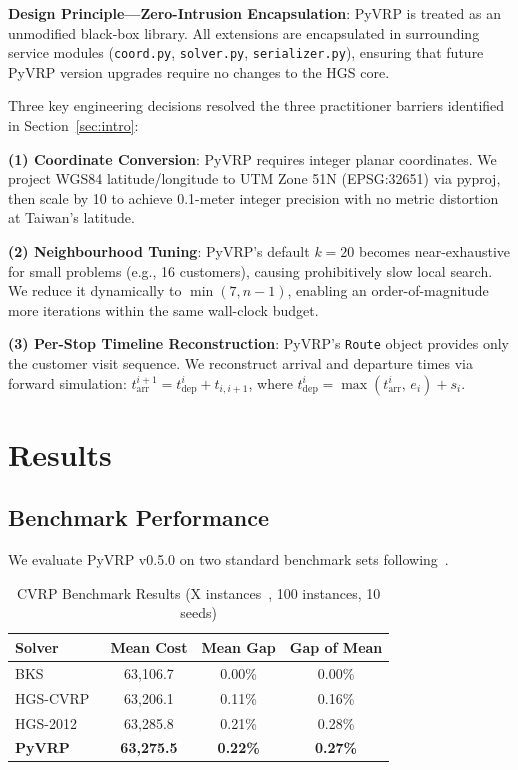 \documentclass[conference]{IEEEtran}
\begin{document}
\textbf{Design Principle---Zero-Intrusion Encapsulation}: PyVRP is treated
as an unmodified black-box library. All extensions are encapsulated in
surrounding service modules (\texttt{coord.py}, \texttt{solver.py},
\texttt{serializer.py}), ensuring that future PyVRP version upgrades require
no changes to the HGS core.

Three key engineering decisions resolved the three practitioner barriers
identified in Section~\ref{sec:intro}:

\textbf{(1) Coordinate Conversion}: PyVRP requires integer planar
coordinates. We project WGS84 latitude/longitude to UTM Zone 51N
(EPSG:32651) via pyproj, then scale by 10 to achieve 0.1-meter integer
precision with no metric distortion at Taiwan's latitude.

\textbf{(2) Neighbourhood Tuning}: PyVRP's default $k=20$ becomes
near-exhaustive for small problems (e.g., 16 customers), causing prohibitively
slow local search. We reduce it dynamically to $\min(7,n{-}1)$, enabling an
order-of-magnitude more iterations within the same wall-clock budget.

\textbf{(3) Per-Stop Timeline Reconstruction}: PyVRP's \texttt{Route}
object provides only the customer visit sequence. We reconstruct arrival and
departure times via forward simulation:
$t_{\text{arr}}^{i+1} = t_{\text{dep}}^i + t_{i,i+1}$, where
$t_{\text{dep}}^i = \max(t_{\text{arr}}^i,\, e_i) + s_i$.

\section{Results}

\subsection{Benchmark Performance}

We evaluate PyVRP v0.5.0 on two standard benchmark sets following~\cite{wouda2024pyvrp}.

\begin{table}[h]
\caption{CVRP Benchmark Results (X instances~\cite{uchoa2017new}, 100 instances, 10 seeds)}
\label{tab:cvrp}
\centering
\begin{tabular}{lccc}
\toprule
\textbf{Solver} & \textbf{Mean Cost} & \textbf{Mean Gap} & \textbf{Gap of Mean} \\
\midrule
BKS             & 63,106.7 & 0.00\% & 0.00\% \\
HGS-CVRP~\cite{vidal2022hybrid} & 63,206.1 & 0.11\% & 0.16\% \\
HGS-2012~\cite{vidal2013hybrid} & 63,285.8 & 0.21\% & 0.28\% \\
\textbf{PyVRP~\cite{wouda2024pyvrp}} & \textbf{63,275.5} & \textbf{0.22\%} & \textbf{0.27\%} \\
\bottomrule
\end{tabular}
\end{table}
\end{document}
